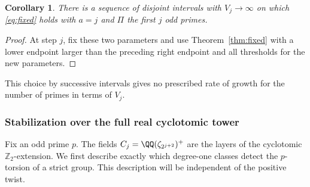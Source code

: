\documentclass[a4paper,11pt]{article}
\newtheorem{corollary}[proposition]{Corollary}
\theoremstyle{definition}
\theoremstyle{remark}
\newcommand{\ZZ}{\mathbb Z}\newcommand{\ord}{\operatorname{ord}}
\numberwithin{equation}{section}
\begin{document}
\begin{corollary}\label{cor:diag}
There is a sequence of disjoint intervals with \(V_j\to\infty\) on which \eqref{eq:fixed} holds with \(a=j\) and \(\Pi\) the first \(j\) odd primes.
\end{corollary}
\begin{proof}
At step \(j\), fix these two parameters and use Theorem~\ref{thm:fixed} with a lower endpoint larger than the preceding right endpoint and all thresholds for the new parameters.
\end{proof}

This choice by successive intervals gives no prescribed rate of growth for the number of primes in terms of \(V_j\).

\subsubsection{Stabilization over the full real cyclotomic tower}\label{nav:II-16}
\label{sec:stable27}

Fix an odd prime \(p\). The fields \(C_j=\QQ(\zeta_{2^{j+2}})^+\) are the layers of the cyclotomic \(\ZZ_2\)-extension. We first describe exactly which degree-one classes detect the \(p\)-torsion of a strict group. This description will be independent of the positive twist.
\end{document}
